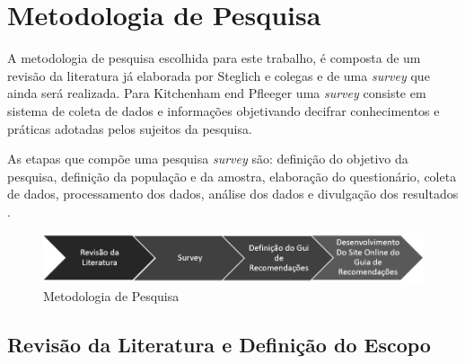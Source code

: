 \chapter{\label{chap:intro}Metodologia de Pesquisa}

A metodologia de pesquisa escolhida para este trabalho, é composta de um revisão da literatura já elaborada por Steglich e colegas \cite{caio2019} e de uma \textit{survey} que ainda será realizada. Para Kitchenham end Pfleeger \cite{pfleeger2001principles} uma \textit{survey} consiste em sistema de coleta de dados e informações objetivando decifrar conhecimentos e práticas adotadas pelos sujeitos da pesquisa.
   
As etapas que compõe uma pesquisa \textit{survey} são:  definição do objetivo da pesquisa, definição da população e da amostra, elaboração do questionário, coleta de dados, processamento dos dados, análise dos dados e divulgação dos resultados \cite{vieira2010dicionario}.

\begin{figure}
    \centering
    \includegraphics[scale=0.66]{fig/processo.PNG}
    \caption{Metodologia de Pesquisa}
    \label{fig:my_label}
\end{figure}

\section{\textbf{Revisão da Literatura e Definição do Escopo}}


